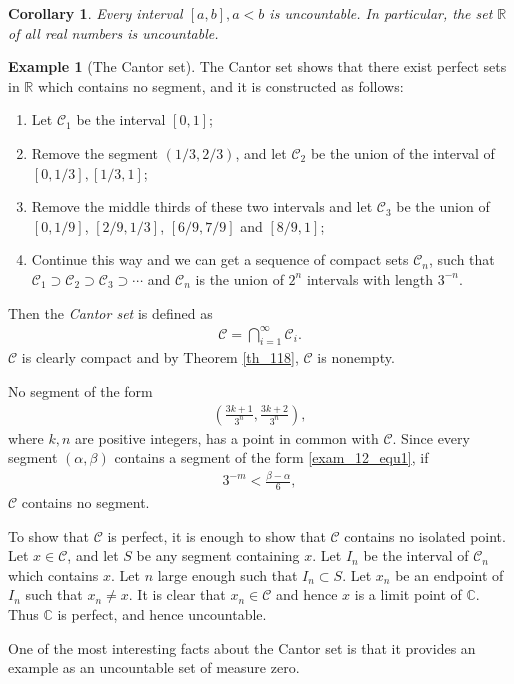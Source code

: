 \documentclass[11pt]{book}
\newtheorem{corollary}{Corollary}[theorem]
\theoremstyle{definition}
\newtheorem{example}{Example}[chapter]
\numberwithin{equation}{chapter}
\begin{document}
\medskip

\begin{corollary}
Every interval $[a,b], a < b$ is uncountable. In particular, the set $\mathbb{R}$ of all real numbers is uncountable.
\end{corollary}

\medskip

\begin{example}[The Cantor set]
The Cantor set shows that there exist perfect sets in $\mathbb{R}$ which contains no segment, and it is constructed as follows:
\begin{enumerate}[label=(\roman*)]
    \item Let $\mathcal{C}_1$ be the interval $[0,1]$;
    
    \item Remove the segment $\left(1/3,2/3\right)$, and let $\mathcal{C}_2$ be the union of the interval of $\left[0,1/3\right],\left[1/3,1\right]$;
    
    \item Remove the middle thirds of these two intervals and let $\mathcal{C}_3$ be the union of $\left[0,1/9\right]$, $\left[2/9,1/3\right]$, $\left[6/9,7/9\right]$ and $\left[8/9,1\right]$;
    
    \item Continue this way and we can get a sequence of compact sets $\mathcal{C}_n$, such that $\mathcal{C}_1\supset \mathcal{C}_2\supset \mathcal{C}_3\supset\cdots$ and $\mathcal{C}_n$ is the union of $2^n$ intervals with length $3^{-n}$.
\end{enumerate}
Then the {\em Cantor set} is defined as 
\begin{align*}
    \mathcal{C} = \bigcap^\infty_{i=1}\mathcal{C}_i.
\end{align*}
$\mathcal{C}$ is clearly compact and by Theorem \ref{th_118}, $\mathcal{C}$ is nonempty.

No segment of the form
\begin{align}\label{exam_12_equ1}
    \left(\frac{3k+1}{3^n}, \frac{3k+2}{3^n}\right),
\end{align}
where $k,n$ are positive integers, has a point in common with $\mathcal{C}$. Since every segment $(\alpha, \beta)$ contains a segment of the form \eqref{exam_12_equ1}, if 
\begin{align*}
    3^{-m} < \frac{\beta - \alpha}{6},
\end{align*}
$\mathcal{C}$ contains no segment.

To show that $\mathcal{C}$ is perfect, it is enough to show that $\mathcal{C}$ contains no isolated point. Let $x \in \mathcal{C}$, and let $S$ be any segment containing $x$. Let $I_n$ be the interval of $\mathcal{C}_n$ which contains $x$. Let $n$ large enough such that $I_n \subset S$. Let $x_n$ be an endpoint of $I_n$ such that $x_n \neq x$. It is clear that $x_n \in \mathcal{C}$ and hence $x$ is a limit point of $\mathbb{C}$. Thus $\mathbb{C}$ is perfect, and hence uncountable. 

One of the most interesting facts about the Cantor set is that it provides an example as an uncountable set of measure zero.
\end{example}
\end{document}
